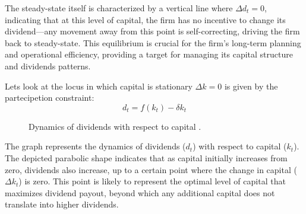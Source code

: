 \documentclass[12pt]{article}
\begin{document}
The steady-state itself is characterized by a vertical line where \(\Delta d_t = 0\), indicating that at this level of
capital, the firm has no incentive to change its dividend—any movement away from this point is self-correcting,
driving the firm back to steady-state. This equilibrium is crucial for the firm's long-term planning and operational
efficiency, providing a target for managing its capital structure and dividends patterns.

Lets look at the locus in which capital is stationary \(\Delta k = 0 \) is given by the partecipetion constraint:
\[d_{t}=f\left(k_t\right) -\delta k_t\]
\begin{figure}
    \centering
    \caption{Dynamics of dividends with respect to capital .}
\end{figure}

The graph represents the dynamics of dividends (\(d_t\)) with respect to capital (\(k_t\)). The depicted parabolic shape
indicates that as capital initially increases from zero, dividends also increase, up to a certain point where the change
in capital (\(\Delta k_t\)) is zero. This point is likely to represent the optimal level of capital that maximizes
dividend payout, beyond which any additional capital does not translate into higher dividends. 
\end{document}
